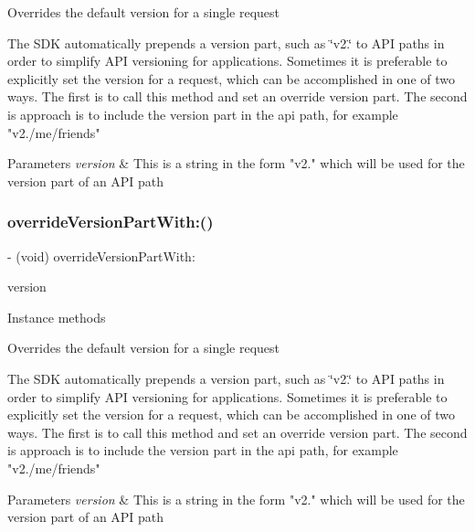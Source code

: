Overrides the default version for a single request

The S\+DK automatically prepends a version part, such as \char`\"{}v2.\char`\"{} to A\+PI paths in order to simplify A\+PI versioning for applications. Sometimes it is preferable to explicitly set the version for a request, which can be accomplished in one of two ways. The first is to call this method and set an override version part. The second is approach is to include the version part in the api path, for example "v2./me/friends"


\begin{DoxyParams}{Parameters}
{\em version} & This is a string in the form "v2." which will be used for the version part of an A\+PI path \\
\hline
\end{DoxyParams}
\mbox{\label{interfaceFBRequest_a96f27df0edb3e41045bf5ba9ede2431c}} 
\subsubsection{\texorpdfstring{override\+Version\+Part\+With\+:()}{overrideVersionPartWith:()}\hspace{0.1cm}{\footnotesize\ttfamily [3/5]}}
{\footnotesize\ttfamily -\/ (void) override\+Version\+Part\+With\+: \begin{DoxyParamCaption}\item[{(N\+S\+String $\ast$)}]{version }\end{DoxyParamCaption}}

Instance methods

Overrides the default version for a single request

The S\+DK automatically prepends a version part, such as \char`\"{}v2.\char`\"{} to A\+PI paths in order to simplify A\+PI versioning for applications. Sometimes it is preferable to explicitly set the version for a request, which can be accomplished in one of two ways. The first is to call this method and set an override version part. The second is approach is to include the version part in the api path, for example "v2./me/friends"


\begin{DoxyParams}{Parameters}
{\em version} & This is a string in the form "v2." which will be used for the version part of an A\+PI path \\
\hline
\end{DoxyParams}
\mbox{\label{interfaceFBRequest_a96f27df0edb3e41045bf5ba9ede2431c}} 
